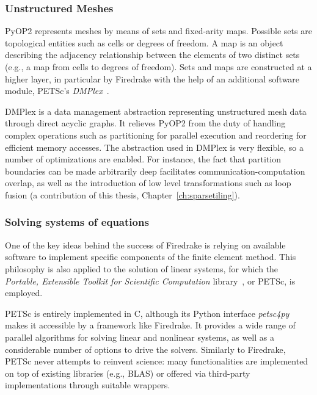 
 \subsubsection{Unstructured Meshes}
 \label{sec:bkg:dmplex}
PyOP2 represents meshes by means of sets and fixed-arity maps. Possible sets are topological entities such as cells or degrees of freedom. A map is an object describing the adjacency relationship between the elements of two distinct sets (e.g., a map from cells to degrees of freedom). Sets and maps are constructed at a higher layer, in particular by Firedrake with the help of an additional software module, PETSc's {\em DMPlex}~\citep{dmplex-cite}. 
 
DMPlex is a data management abstraction representing unstructured mesh data through direct acyclic graphs. It relieves PyOP2 from the duty of handling complex operations such as partitioning for parallel execution and reordering for efficient memory accesses. The abstraction used in DMPlex is very flexible, so a number of optimizations are enabled. For instance, the fact that partition boundaries can be made arbitrarily deep facilitates communication-computation overlap, as well as the introduction of low level transformations such as loop fusion (a contribution of this thesis, Chapter~\ref{ch:sparsetiling}).
 
 \subsubsection{Solving systems of equations}
One of the key ideas behind the success of Firedrake is relying on available software to implement specific components of the finite element method. This philosophy is also applied to the solution of linear systems, for which the {\em Portable, Extensible Toolkit for Scientific Computation} library~\citep{petsc-cite}, or PETSc, is employed. 

PETSc is entirely implemented in C, although its Python interface {\em petsc4py} makes it accessible by a framework like Firedrake. It provides a wide range of parallel algorithms for solving linear and nonlinear systems, as well as a considerable number of options to drive the solvers. Similarly to Firedrake, PETSc never attempts to reinvent science: many functionalities are implemented on top of existing libraries (e.g., BLAS) or offered via third-party implementations through suitable wrappers.


